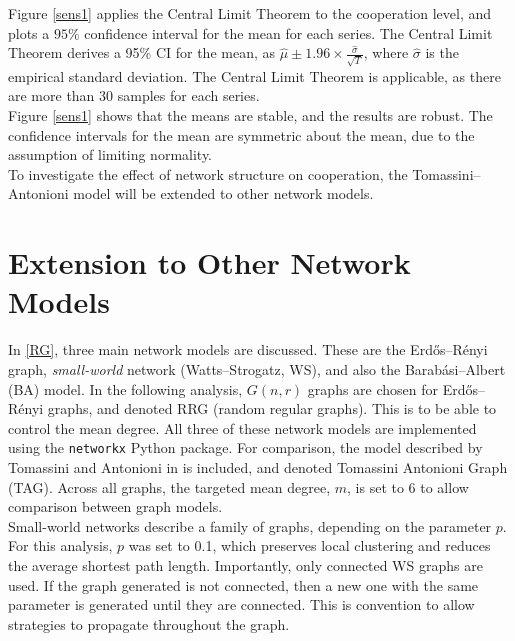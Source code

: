 Figure \ref{sens1} applies the Central Limit Theorem to the cooperation level, and plots a $95\%$ confidence interval for the mean for each series. The Central Limit Theorem derives a 95\% CI for the mean, as $\hat{\mu} \pm 1.96\times\frac{\hat{\sigma}}{\sqrt{T}}$, where $\hat{\sigma}$ is the empirical standard deviation. The Central Limit Theorem is applicable, as there are more than 30 samples for each series. \\
\FloatBarrier
{}
\FloatBarrier
Figure \ref{sens1} shows that the means are stable, and the results are robust. The confidence intervals for the mean are symmetric about the mean, due to the assumption of limiting normality. \\

To investigate the effect of network structure on cooperation, the Tomassini--Antonioni model will be extended to other network models. \\

\section{Extension to Other Network Models} \label{other_networks}

In \ref{RG}, three main network models are discussed. These are the Erd\H{o}s--R\'enyi graph, \emph{small-world} network (Watts--Strogatz, WS), and also the Barab\'{a}si--Albert (BA) model. In the following analysis, $G(n,r)$ graphs are chosen for Erd\H{o}s--R\'enyi graphs, and denoted RRG (random regular graphs). This is to be able to control the mean degree. All three of these network models are implemented using the \verb+networkx+ Python package. For comparison, the model described by Tomassini and Antonioni in \cite{RN51} is included, and denoted Tomassini Antonioni Graph (TAG). Across all graphs, the targeted mean degree, $m$, is set to 6 to allow comparison between graph models. \\

Small-world networks describe a family of graphs, depending on the parameter $p$. For this analysis, $p$ was set to 0.1, which preserves local clustering and reduces the average shortest path length. Importantly, only connected WS graphs are used. If the graph generated is not connected, then a new one with the same parameter is generated until they are connected. This is convention to allow strategies to propagate throughout the graph. \\

